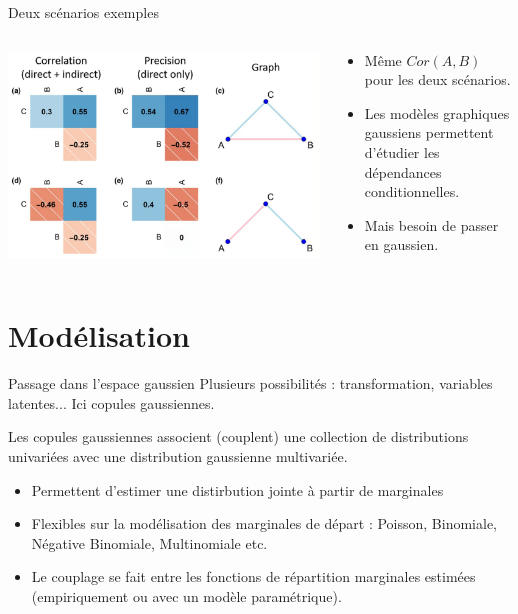 \documentclass[11pt]{beamer}
\newcommand{\emphase}[1]{\textcolor{Complement}{#1}}
\newcommand{\bleu}[1]{\textcolor{Framableulight}{#1}}
\begin{document}
\begin{frame}{Deux scénarios exemples}
\begin{columns}
\begin{column}{0.65\linewidth}
 
\includegraphics[width=\linewidth]{images/cor_parcor.png}
 
\end{column}
\begin{column}{0.35\linewidth}
\pause
\begin{itemize}
\item Même $Cor(A,B)$ pour les deux scénarios.
\item Les modèles graphiques gaussiens permettent d'étudier les dépendances conditionnelles.
\item Mais besoin de \emphase{passer en gaussien}.
\end{itemize}
\end{column}
\end{columns}
\end{frame}
\section{Modélisation}
\begin{frame}{Passage dans l'espace gaussien}
Plusieurs possibilités : transformation, variables latentes... Ici copules gaussiennes.
\bigskip

\bleu{Les copules gaussiennes} associent (couplent) une collection de distributions univariées avec une distribution gaussienne multivariée.
\bigskip

\begin{itemize}
\item Permettent d'\emphase{estimer une distirbution jointe} à partir de marginales
\item \emphase{Flexibles} sur la modélisation des marginales de départ : Poisson, Binomiale, Négative Binomiale, Multinomiale etc.
\item Le couplage se fait entre les fonctions de répartition marginales estimées (empiriquement ou avec un modèle paramétrique).
\end{itemize}
\end{frame}
\end{document}
